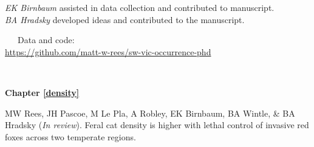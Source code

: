 \documentclass[11pt,a4paper,titlepage,twoside,openright]{style/unimelbthesis}
\begin{document}
\begin{frontmatter}
\begin{preface}
    \hspace*{0.333em}\hspace*{0.333em}\hspace*{0.333em}\hspace*{0.333em}\hspace*{0.333em}\hspace*{0.333em}\hspace*{0.333em}\hspace*{0.333em}\emph{EK Birnbaum} assisted in data collection and contributed to manuscript.\\
    \hspace*{0.333em}\hspace*{0.333em}\hspace*{0.333em}\hspace*{0.333em}\hspace*{0.333em}\hspace*{0.333em}\hspace*{0.333em}\hspace*{0.333em}\emph{BA Hradsky} developed ideas and contributed to the manuscript.

    ~~~Data and code:\\
    \url{https://github.com/matt-w-rees/sw-vic-occurrence-phd}

    \(~\)

    \textbf{Chapter \ref{density}}

    MW Rees, JH Pascoe, M Le Pla, A Robley, EK Birnbaum, BA Wintle, \& BA Hradsky (\emph{In review}). Feral cat density is higher with lethal control of invasive red foxes across two temperate regions.


\end{preface}
\end{frontmatter}
\end{document}
